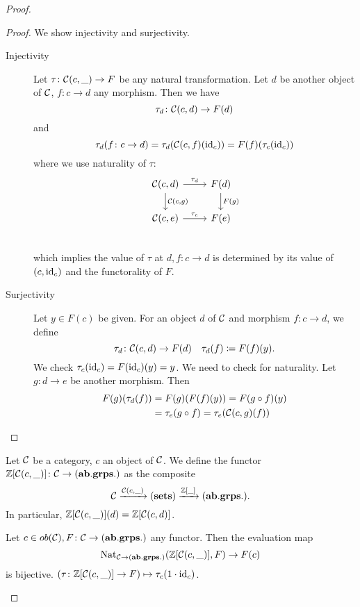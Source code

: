 \documentclass[language=english]{TemplateLecture}
\begin{document}
\begin{proof}
    \begin{proof}
        We show injectivity and surjectivity.
        \begin{description}
            \item[Injectivity] Let \(\tau\colon \mathcal{C}(c,\_) \to F\) be any natural transformation. Let \(d\) be another object of \(\mathcal{C}\), \(f\colon c\to d\) any morphism. Then we have
            \[\tau_d\colon \mathcal{C}(c,d) \to F(d)\]
            and
            \[\tau_d(f\colon c \to d) = \tau_d(\mathcal{C}(c,f)(\operatorname{id}_c)) = F(f) (\tau_c(\operatorname{id}_c))\]
            where we use naturality of \(\tau\):
            \[\begin{tikzcd}
                {\cC(c,d)} \ar[r, "\tau_d"] \ar[d, "{\cC(c,g)}"] & F(d) \ar[d, "F(g)"] \\
                {\cC(c,e)} \ar[r, "\tau_e"] & F(e) \\
            \end{tikzcd}\]
            which implies the value of \(\tau\) at \(d,f\colon c\to d\) is determined by its value of \((c, \operatorname{id}_c)\) and the functorality of \(F\).
            \item[Surjectivity] Let \(y \in F(c)\) be given. For an object \(d\) of \(\mathcal{C}\) and morphism \(f\colon c \to d\), we define
            \[\tau_d\colon \mathcal{C}(c,d) \to F(d) \quad \tau_d(f) \coloneq F(f)(y).\]
            We check \(\tau_c(\operatorname{id}_c) = F(\operatorname{id}_c)(y) = y\).
            We need to check for naturality. Let \(g\colon d \to e \) be another morphism. Then
            \[\begin{split}
                F(g)(\tau_d(f)) &= F(g)(F(f)(y)) = F(g\circ f)(y) \\
                &= \tau_e(g\circ f) = \tau_e(\mathcal{C}(c,g)(f)) \\
            \end{split}\]
         \end{description}
    \end{proof}

    Let \(\mathcal{C}\) be a category, \(c\) an object of \(\mathcal{C}\). We define the functor \(\mathbb{Z}[\mathcal{C}(c,\_)]\colon \mathcal{C} \to (\mathbf{ab.grps.})\) as the composite
    \[\mathcal{C} \xrightarrow{\mathcal{C}(c,\_)} (\mathbf{sets}) \xrightarrow{\mathbb{Z}[\_]} (\mathbf{ab.grps.}).\]
    In particular, \(\mathbb{Z}[\mathcal{C}(c, \_)] (d) = \mathbb{Z}[\mathcal{C}(c,d)]\).
    \begin{Proposition}
        Let \(c \in ob(\mathcal{C}), F\colon \mathcal{C} \to (\mathbf{ab.grps.})\) any functor. Then the evaluation map
        \[\mathrm{Nat}_{\mathcal{C} \to (\mathbf{ab.grps.})}(\mathbb{Z}[\mathcal{C}(c,\_)], F) \to F(c)\]
        is bijective. \((\tau\colon \mathbb{Z}[\mathcal{C}(c, \_)] \to F) \mapsto \tau_c(1\cdot \operatorname{id}_c)\).
    \end{Proposition}


\end{proof}
\end{document}
